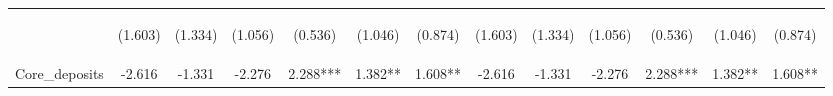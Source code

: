 \documentclass[]{article}
\begin{document}
\begin{center}
\begin{tabular}{lcccccccccccc}
\vspace{4pt} & \begin{footnotesize}(1.603)\end{footnotesize} & \begin{footnotesize}(1.334)\end{footnotesize} & \begin{footnotesize}(1.056)\end{footnotesize} & \begin{footnotesize}(0.536)\end{footnotesize} & \begin{footnotesize}(1.046)\end{footnotesize} & \begin{footnotesize}(0.874)\end{footnotesize} & \begin{footnotesize}(1.603)\end{footnotesize} & \begin{footnotesize}(1.334)\end{footnotesize} & \begin{footnotesize}(1.056)\end{footnotesize} & \begin{footnotesize}(0.536)\end{footnotesize} & \begin{footnotesize}(1.046)\end{footnotesize} & \begin{footnotesize}(0.874)\end{footnotesize} \\
Core\_deposits & -2.616 & -1.331 & -2.276 & 2.288*** & 1.382** & 1.608** & -2.616 & -1.331 & -2.276 & 2.288*** & 1.382** & 1.608** \\

\end{tabular}
\end{center}
\end{document}
